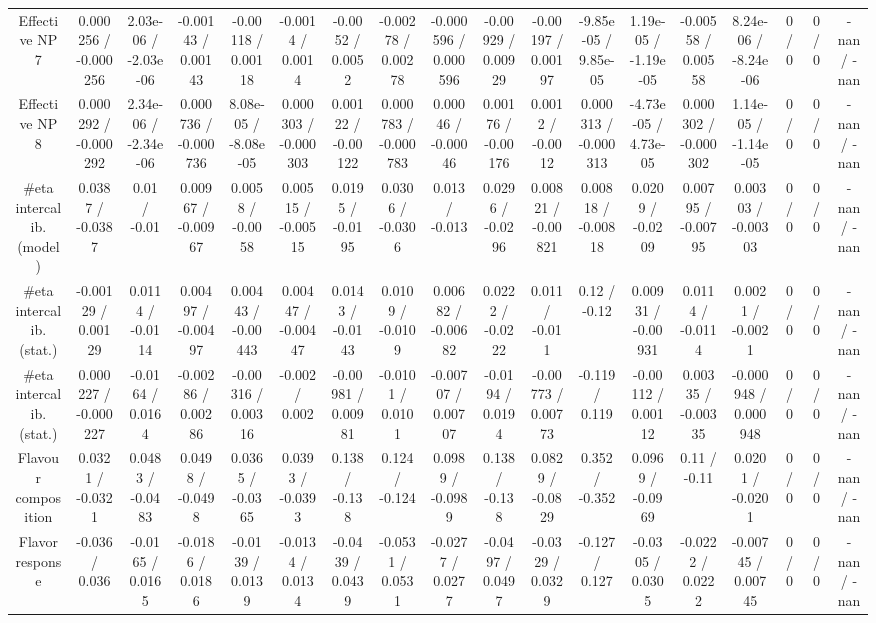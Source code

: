 \documentclass[10pt]{article}
\begin{document}
\begin{table}[htbp]
\begin{center}
\begin{tabular}{|c|c|c|c|c|c|c|c|c|c|c|c|c|c|c|c|c|c|}
  Effective NP 7 & 0.000256 / -0.000256 & 2.03e-06 / -2.03e-06 & -0.00143 / 0.00143 & -0.00118 / 0.00118 & -0.0014 / 0.0014 & -0.0052 / 0.0052 & -0.00278 / 0.00278 & -0.000596 / 0.000596 & -0.00929 / 0.00929 & -0.00197 / 0.00197 & -9.85e-05 / 9.85e-05 & 1.19e-05 / -1.19e-05 & -0.00558 / 0.00558 & 8.24e-06 / -8.24e-06 & 0 / 0 & 0 / 0 & -nan / -nan \\ 
  Effective NP 8 & 0.000292 / -0.000292 & 2.34e-06 / -2.34e-06 & 0.000736 / -0.000736 & 8.08e-05 / -8.08e-05 & 0.000303 / -0.000303 & 0.00122 / -0.00122 & 0.000783 / -0.000783 & 0.00046 / -0.00046 & 0.00176 / -0.00176 & 0.0012 / -0.0012 & 0.000313 / -0.000313 & -4.73e-05 / 4.73e-05 & 0.000302 / -0.000302 & 1.14e-05 / -1.14e-05 & 0 / 0 & 0 / 0 & -nan / -nan \\ 
  #eta intercalib. (model) & 0.0387 / -0.0387 & 0.01 / -0.01 & 0.00967 / -0.00967 & 0.0058 / -0.0058 & 0.00515 / -0.00515 & 0.0195 / -0.0195 & 0.0306 / -0.0306 & 0.013 / -0.013 & 0.0296 / -0.0296 & 0.00821 / -0.00821 & 0.00818 / -0.00818 & 0.0209 / -0.0209 & 0.00795 / -0.00795 & 0.00303 / -0.00303 & 0 / 0 & 0 / 0 & -nan / -nan \\ 
  #eta intercalib. (stat.) & -0.00129 / 0.00129 & 0.0114 / -0.0114 & 0.00497 / -0.00497 & 0.00443 / -0.00443 & 0.00447 / -0.00447 & 0.0143 / -0.0143 & 0.0109 / -0.0109 & 0.00682 / -0.00682 & 0.0222 / -0.0222 & 0.011 / -0.011 & 0.12 / -0.12 & 0.00931 / -0.00931 & 0.0114 / -0.0114 & 0.0021 / -0.0021 & 0 / 0 & 0 / 0 & -nan / -nan \\ 
  #eta intercalib. (stat.) & 0.000227 / -0.000227 & -0.0164 / 0.0164 & -0.00286 / 0.00286 & -0.00316 / 0.00316 & -0.002 / 0.002 & -0.00981 / 0.00981 & -0.0101 / 0.0101 & -0.00707 / 0.00707 & -0.0194 / 0.0194 & -0.00773 / 0.00773 & -0.119 / 0.119 & -0.00112 / 0.00112 & 0.00335 / -0.00335 & -0.000948 / 0.000948 & 0 / 0 & 0 / 0 & -nan / -nan \\ 
  Flavour composition & 0.0321 / -0.0321 & 0.0483 / -0.0483 & 0.0498 / -0.0498 & 0.0365 / -0.0365 & 0.0393 / -0.0393 & 0.138 / -0.138 & 0.124 / -0.124 & 0.0989 / -0.0989 & 0.138 / -0.138 & 0.0829 / -0.0829 & 0.352 / -0.352 & 0.0969 / -0.0969 & 0.11 / -0.11 & 0.0201 / -0.0201 & 0 / 0 & 0 / 0 & -nan / -nan \\ 
  Flavor response & -0.036 / 0.036 & -0.0165 / 0.0165 & -0.0186 / 0.0186 & -0.0139 / 0.0139 & -0.0134 / 0.0134 & -0.0439 / 0.0439 & -0.0531 / 0.0531 & -0.0277 / 0.0277 & -0.0497 / 0.0497 & -0.0329 / 0.0329 & -0.127 / 0.127 & -0.0305 / 0.0305 & -0.0222 / 0.0222 & -0.00745 / 0.00745 & 0 / 0 & 0 / 0 & -nan / -nan \\ 

\end{tabular}
\end{center}
\end{table}
\end{document}
